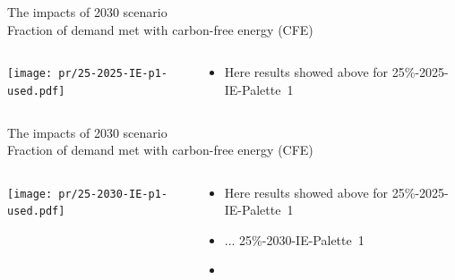 
\begin{frame}{The impacts of 2030 scenario  \\ 
Fraction of demand met with carbon-free energy (CFE) }

\begin{columns}[T]
\begin{column}{9cm}
\centering

\texttt{[image: pr/25-2025-IE-p1-used.pdf]}
\end{column}
\begin{column}{5cm}

  \begin{itemize}
  \item Here results showed above for 25\%-\alert{2025}-IE-Palette~1
  \end{itemize}
  
\end{column}
\end{columns}

\end{frame}



\begin{frame}{The impacts of 2030 scenario \\ 
Fraction of demand met with carbon-free energy (CFE) }

\begin{columns}[T]
\begin{column}{9cm}
\centering

\texttt{[image: pr/25-2030-IE-p1-used.pdf]}
\end{column}
\begin{column}{5cm}

  \begin{itemize}
  \item Here results showed above for 25\%-\alert{2025}-IE-Palette~1
  \item ... 25\%-\alert{2030}-IE-Palette~1
  \item 
  \end{itemize}
  
\end{column}
\end{columns}

\end{frame}


